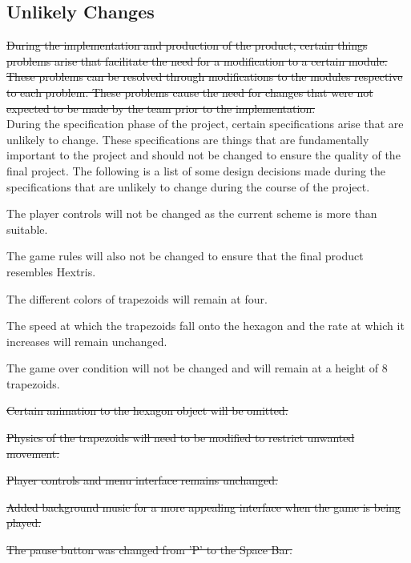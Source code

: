 \documentclass[12pt, titlepage]{article}
\begin{document}
\subsection{Unlikely Changes}
\sout{During the implementation and production of the product, certain things problems arise that facilitate the need for a modification to a certain module. These problems can be resolved through modifications to the modules respective to each problem. These problems cause the need for changes that were not expected to be made by the team prior to the implementation.}\\

{\color{blue}During the specification phase of the project, certain specifications arise that are unlikely to change. These specifications are things that are fundamentally important to the project and should not be changed to ensure the quality of the final project. The following is a list of some design decisions made during the specifications that are unlikely to change during the course of the project.}
 


\begin{enumerate}[label=\textbf{UC\arabic*:}]
{\color{blue}%
  \item The player controls will not be changed as the current scheme is more than suitable.
  \item The game rules will also not be changed to ensure that the final product resembles Hextris.
  \item The different colors of trapezoids will remain at four.
  \item The speed at which the trapezoids fall onto the hexagon and the rate at which it increases will remain unchanged.
  \item The game over condition will not be changed and will remain at a height of 8 trapezoids.
  
}%
  \item \sout{Certain animation to the hexagon object will be omitted.}
  \item \sout{Physics of the trapezoids will need to be modified to restrict unwanted movement.}
  \item \sout{Player controls and menu interface remains unchanged.}
  \item \sout{Added background music for a more appealing interface when the game is being played.}
  \item \sout{The pause button was changed from 'P' to the Space Bar.}
\end{enumerate}
\end{document}
